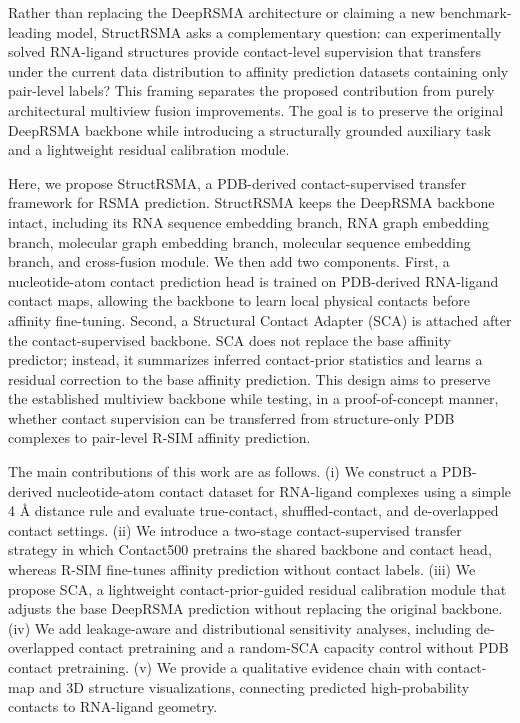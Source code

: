 ﻿\documentclass[journal=jcisd8,manuscript=article]{achemso}
\begin{document}
Rather than replacing the DeepRSMA architecture or claiming a new benchmark-leading model, StructRSMA asks a complementary question: can experimentally solved RNA-ligand structures provide contact-level supervision that transfers under the current data distribution to affinity prediction datasets containing only pair-level labels? This framing separates the proposed contribution from purely architectural multiview fusion improvements. The goal is to preserve the original DeepRSMA backbone while introducing a structurally grounded auxiliary task and a lightweight residual calibration module.

Here, we propose StructRSMA, a PDB-derived contact-supervised transfer framework for RSMA prediction. StructRSMA keeps the DeepRSMA backbone intact, including its RNA sequence embedding branch, RNA graph embedding branch, molecular graph embedding branch, molecular sequence embedding branch, and cross-fusion module. We then add two components. First, a nucleotide-atom contact prediction head is trained on PDB-derived RNA-ligand contact maps, allowing the backbone to learn local physical contacts before affinity fine-tuning. Second, a Structural Contact Adapter (SCA) is attached after the contact-supervised backbone. SCA does not replace the base affinity predictor; instead, it summarizes inferred contact-prior statistics and learns a residual correction to the base affinity prediction. This design aims to preserve the established multiview backbone while testing, in a proof-of-concept manner, whether contact supervision can be transferred from structure-only PDB complexes to pair-level R-SIM affinity prediction.

The main contributions of this work are as follows. (i) We construct a PDB-derived nucleotide-atom contact dataset for RNA-ligand complexes using a simple 4 \AA{} distance rule and evaluate true-contact, shuffled-contact, and de-overlapped contact settings. (ii) We introduce a two-stage contact-supervised transfer strategy in which Contact500 pretrains the shared backbone and contact head, whereas R-SIM fine-tunes affinity prediction without contact labels. (iii) We propose SCA, a lightweight contact-prior-guided residual calibration module that adjusts the base DeepRSMA prediction without replacing the original backbone. (iv) We add leakage-aware and distributional sensitivity analyses, including de-overlapped contact pretraining and a random-SCA capacity control without PDB contact pretraining. (v) We provide a qualitative evidence chain with contact-map and 3D structure visualizations, connecting predicted high-probability contacts to RNA-ligand geometry.
\end{document}
